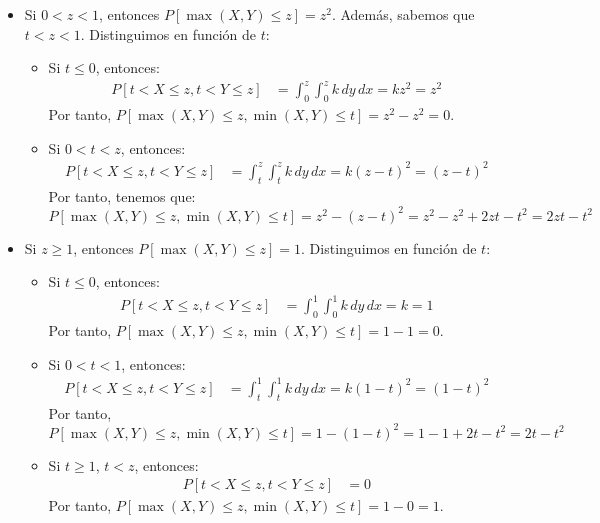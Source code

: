 \begin{ejercicio}
\begin{enumerate}
\begin{itemize}
\begin{itemize}
                \item Si $0<z<1$, entonces $P[\max(X,Y)\leq z]=z^2$. Además, sabemos que $t<z<1$. Distinguimos en función de $t$:
                \begin{itemize}
                    \item Si $t\leq 0$, entonces:
                    \begin{align*}
                        P[t<X\leq z,t<Y\leq z]&=\int_{0}^{z}\int_{0}^{z} k \, dy \, dx = kz^2 = z^2
                    \end{align*}
                    Por tanto, $P[\max(X,Y)\leq z,\min(X,Y)\leq t]=z^2-z^2=0$.
                    \item Si $0<t<z$, entonces:
                    \begin{align*}
                        P[t<X\leq z,t<Y\leq z]&=\int_{t}^{z}\int_{t}^{z} k \, dy \, dx = k(z-t)^2 = (z-t)^2
                    \end{align*}
                    Por tanto, tenemos que:
                    $$P[\max(X,Y)\leq z,\min(X,Y)\leq t]=z^2-(z-t)^2=z^2-z^2+2zt-t^2=2zt-t^2$$
                \end{itemize}
                \item Si $z\geq 1$, entonces $P[\max(X,Y)\leq z]=1$. Distinguimos en función de $t$:
                \begin{itemize}
                    \item Si $t\leq 0$, entonces:
                    \begin{align*}
                        P[t<X\leq z,t<Y\leq z]&=\int_{0}^{1}\int_{0}^{1} k \, dy \, dx = k = 1
                    \end{align*}
                    Por tanto, $P[\max(X,Y)\leq z,\min(X,Y)\leq t]=1-1=0$.
                    \item Si $0<t<1$, entonces:
                    \begin{align*}
                        P[t<X\leq z,t<Y\leq z]&=\int_{t}^{1}\int_{t}^{1} k \, dy \, dx = k(1-t)^2 = (1-t)^2
                    \end{align*}
                    Por tanto, $$P[\max(X,Y)\leq z,\min(X,Y)\leq t]=1-(1-t)^2=1-1+2t-t^2=2t-t^2$$
                    \item Si $t\geq 1$, $t<z$, entonces:
                    \begin{align*}
                        P[t<X\leq z,t<Y\leq z]&=0
                    \end{align*}
                    Por tanto, $P[\max(X,Y)\leq z,\min(X,Y)\leq t]=1-0=1$.
                \end{itemize}
            \end{itemize}
        \end{itemize}
        

\end{enumerate}
\end{ejercicio}
